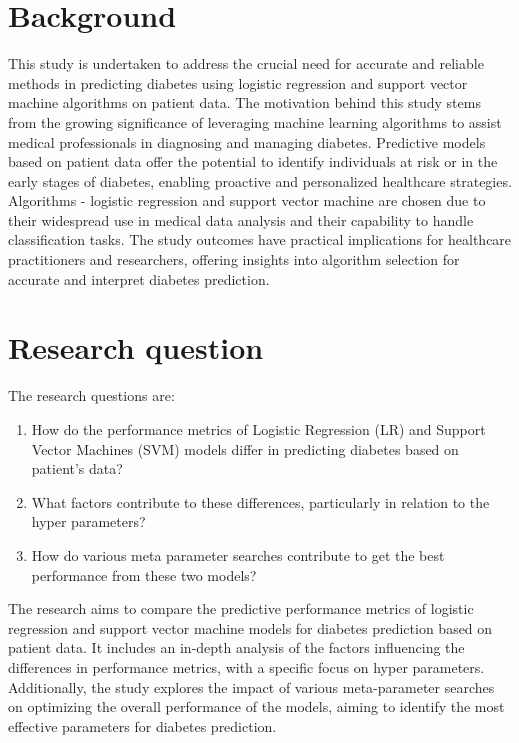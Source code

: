 \section{Background}
\label{sec:into_back}
This study is undertaken to address the crucial need for accurate and reliable methods in predicting diabetes using logistic regression and support vector machine algorithms on patient data. The motivation behind this study stems from the growing significance of leveraging machine learning algorithms to assist medical professionals in diagnosing and managing diabetes. Predictive models based on patient data offer the potential to identify individuals at risk or in the early stages of diabetes, enabling proactive and personalized healthcare strategies. Algorithms - logistic regression and support vector machine are chosen due to their widespread use in medical data analysis and their capability to handle classification tasks. The study outcomes have practical implications for healthcare practitioners and researchers, offering insights into algorithm selection for accurate and interpret diabetes prediction.

\section{Research question}
\label{sec:intro_prob_art}
The research questions are: 
\begin{enumerate}
    \item How do the performance metrics of Logistic Regression (LR) and Support Vector Machines (SVM) models differ in predicting diabetes based on patient's data?
    \item What factors contribute to these differences, particularly in relation to the hyper parameters?  
    \item How do various meta parameter searches contribute to get the best performance from these two models?
\end{enumerate}

The research aims to compare the predictive performance metrics of logistic regression and support vector machine models for diabetes prediction based on patient data. It includes an in-depth analysis of the factors influencing the differences in performance metrics, with a specific focus on hyper parameters. Additionally, the study explores the impact of various meta-parameter searches on optimizing the overall performance of the models, aiming to identify the most effective parameters for diabetes prediction.
